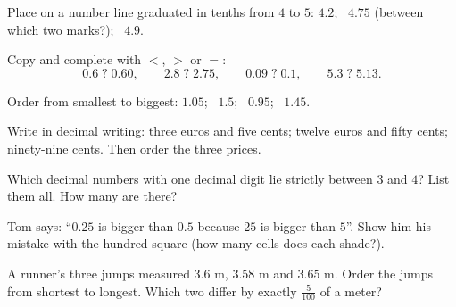 \begin{exercise}[$\star$]\label{exo:g4:decimals:5}
Place on a number line graduated in tenths from $4$ to $5$:
$4.2$; \ $4.75$ (between which two marks?); \ $4.9$.
\end{exercise}

\begin{exercise}[$\star$]\label{exo:g4:decimals:6}
Copy and complete with $<$, $>$ or $=$:
\[
0.6 \;?\; 0.60, \qquad
2.8 \;?\; 2.75, \qquad
0.09 \;?\; 0.1, \qquad
5.3 \;?\; 5.13 .
\]
\end{exercise}

\begin{exercise}[$\star$]\label{exo:g4:decimals:7}
Order from smallest to biggest: $1.05$; \ $1.5$; \ $0.95$; \ $1.45$.
\end{exercise}

\begin{exercise}[$\star$]\label{exo:g4:decimals:8}
Write in decimal writing: three euros and five cents; twelve euros
and fifty cents; ninety-nine cents. Then order the three prices.
\end{exercise}

\begin{exercise}[$\star$]\label{exo:g4:decimals:9}
Which decimal numbers with one decimal digit lie strictly between
$3$ and $4$? List them all. How many are there?
\end{exercise}

\begin{exercise}[$\star\star$]\label{exo:g4:decimals:10}
Tom says: ``$0.25$ is bigger than $0.5$ because $25$ is bigger than
$5$''. Show him his mistake with the hundred-square (how many cells
does each shade?).
\end{exercise}

\begin{exercise}[$\star\star$]\label{exo:g4:decimals:11}
A runner's three jumps measured $3.6$ m, $3.58$ m and $3.65$ m.
Order the jumps from shortest to longest. Which two differ by
exactly $\frac{5}{100}$ of a meter?
\end{exercise}
